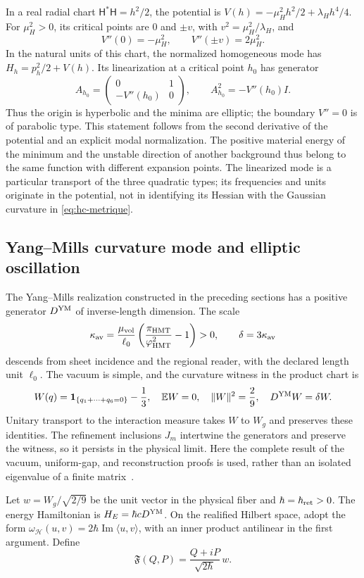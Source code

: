 In a real radial chart \(\mathsf H^*\mathsf H=h^2/2\), the potential
is \(V(h)=-\mu_H^2h^2/2+\lambda_Hh^4/4\). For
\(\mu_H^2>0\), its critical points are \(0\) and
\(\pm v\), with \(v^2=\mu_H^2/\lambda_H\), and
\[
 V''(0)=-\mu_H^2,\qquad V''(\pm v)=2\mu_H^2.
\]
In the natural units of this chart, the normalized homogeneous mode has
\(H_h=p_h^2/2+V(h)\). Its linearization at a critical point \(h_0\)
has generator
\[
 A_{h_0}=\begin{pmatrix}0&1\\-V''(h_0)&0\end{pmatrix},
 \qquad A_{h_0}^2=-V''(h_0)I.
\]
Thus the origin is hyperbolic and the minima are elliptic; the
boundary \(V''=0\) is of parabolic type. This statement follows
from the second derivative of the potential and an explicit modal
normalization. The positive material energy of the minimum and the unstable
direction of another background thus belong to the same function with different
expansion points. The linearized mode is a particular transport of
the three quadratic types; its frequencies and units originate in the
potential, not in identifying its Hessian with the Gaussian curvature in
\eqref{eq:hc-metrique}.

\subsection{Yang--Mills curvature mode and elliptic oscillation}

The Yang--Mills realization constructed in the preceding sections
has a positive generator \(D^{\rm YM}\) of inverse-length
dimension. The scale
\[
 \kappa_{\rm av}=\frac{\mu_{\rm vol}}{\ell_0}
 \left(\frac{\pi_{\rm HMT}}{\varphi_{\rm HMT}^2}-1\right)>0,
 \qquad \delta=3\kappa_{\rm av}
\]
descends from sheet incidence and the regional reader, with the declared
length unit \(\ell_0\). The vacuum is simple, and the curvature
witness in the product chart is
\[
 W(q)=\mathbf1_{\{q_1+\cdots+q_6=0\}}-\frac13,
 \quad \mathbb EW=0,\quad \|W\|^2=\frac29,
 \quad D^{\rm YM}W=\delta W.
\]
Unitary transport to the interaction measure takes \(W\) to
\(W_g\) and preserves these identities. The refinement inclusions
\(J_m\) intertwine the generators and preserve the witness, so
it persists in the physical limit. Here the complete result of the
vacuum, uniform-gap, and reconstruction proofs is used, rather than an
isolated eigenvalue of a finite matrix~\cite{HMT-YM}.

Let \(w=W_g/\sqrt{2/9}\) be the unit vector in the physical fiber and
\(\hbar=\hbar_{\rm ret}>0\). The energy Hamiltonian is
\(H_E=\hbar cD^{\rm YM}\). On the realified Hilbert space,
adopt the form \(\omega_{\mathcal H}(u,v)=2\hbar
\operatorname{Im}\langle u,v\rangle\), with an inner product antilinear
in the first argument. Define
\begin{equation}
 \mathfrak F(Q,P)=\frac{Q+iP}{\sqrt{2\hbar}}\,w.
 \label{eq:hc-ym-embedding}
\end{equation}

